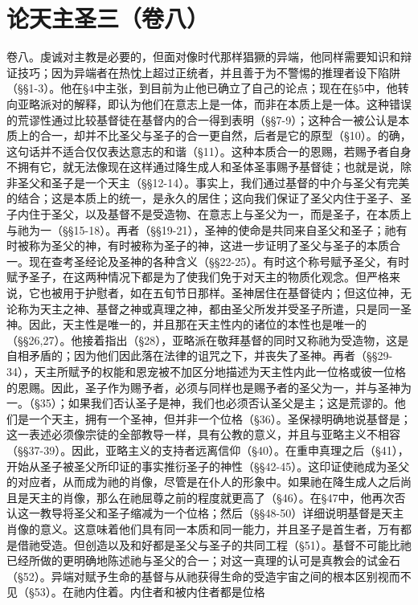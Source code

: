 

\section{论天主圣三（卷八）}

卷八。虔诚对主教是必要的，但面对像时代那样猖獗的异端，他同样需要知识和辩证技巧；因为异端者在热忱上超过正统者，并且善于为不警惕的推理者设下陷阱（§§1-3）。他在§4中主张，到目前为止他已确立了自己的论点；现在在§5中，他转向亚略派对的解释，即认为他们在意志上是一体，而非在本质上是一体。这种错误的荒谬性通过比较基督徒在基督内的合一得到表明（§§7-9）；这种合一被公认是本质上的合一，却并不比圣父与圣子的合一更自然，后者是它的原型（§10）。的确，这句话并不适合仅仅表达意志的和谐（§11）。这种本质合一的恩赐，若赐予者自身不拥有它，就无法像现在这样通过降生成人和圣体圣事赐予基督徒；也就是说，除非圣父和圣子是一个天主（§§12-14）。事实上，我们通过基督的中介与圣父有完美的结合；这是本质上的统一，是永久的居住；这向我们保证了圣父内住于圣子、圣子内住于圣父，以及基督不是受造物、在意志上与圣父为一，而是圣子，在本质上与祂为一（§§15-18）。再者（§§19-21），圣神的使命是共同来自圣父和圣子；祂有时被称为圣父的神，有时被称为圣子的神，这进一步证明了圣父与圣子的本质合一。现在查考圣经论及圣神的各种含义（§§22-25）。有时这个称号赋予圣父，有时赋予圣子，在这两种情况下都是为了使我们免于对天主的物质化观念。但严格来说，它也被用于护慰者，如在五旬节日那样。圣神居住在基督徒内；但这位神，无论称为天主之神、基督之神或真理之神，都由圣父所发并受圣子所遣，只是同一圣神。因此，天主性是唯一的，并且那在天主性内的诸位的本性也是唯一的（§§26,27）。他接着指出（§28），亚略派在敬拜基督的同时又称祂为受造物，这是自相矛盾的；因为他们因此落在法律的诅咒之下，并丧失了圣神。再者（§§29-34），天主所赋予的权能和恩宠被不加区分地描述为天主性内此一位格或彼一位格的恩赐。因此，圣子作为赐予者，必须与同样也是赐予者的圣父为一，并与圣神为一。（§35）；如果我们否认圣子是神，我们也必须否认圣父是主；这是荒谬的。他们是一个天主，拥有一个圣神，但并非一个位格（§36）。圣保禄明确地说基督是；这一表述必须像宗徒的全部教导一样，具有公教的意义，并且与亚略主义不相容（§§37-39）。因此，亚略主义的支持者远离信仰（§40）。在重申真理之后（§41），开始从圣子被圣父所印证的事实推衍圣子的神性（§§42-45）。这印证使祂成为圣父的对应者，从而成为祂的肖像，尽管是在仆人的形象中。如果祂在降生成人之后尚且是天主的肖像，那么在祂屈尊之前的程度就更高了（§46）。在§47中，他再次否认这一教导将圣父和圣子缩减为一个位格；然后（§§48-50）详细说明基督是天主肖像的意义。这意味着他们具有同一本质和同一能力，并且圣子是首生者，万有都是借祂受造。但创造以及和好都是圣父与圣子的共同工程（§51）。基督不可能比祂已经所做的更明确地陈述祂与圣父的合一；对这一真理的认可是真教会的试金石（§52）。异端对赋予生命的基督与从祂获得生命的受造宇宙之间的根本区别视而不见（§53）。在祂内住着。内住者和被内住者都是位格
